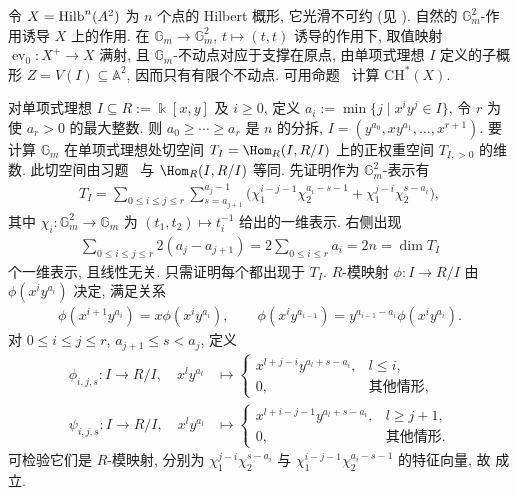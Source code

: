 \begin{example}\label{src:7.8.22}
令 $X=\operatorname{Hilb}^n(A^2)$ 为 $n$ 个点的 Hilbert 概形, 它光滑不可约 (见 ). 自然的 $\mathbb G_m^2$-作用诱导 $X$ 上的作用. 在 $\mathbb G_m\to\mathbb G_m^2$, $t\mapsto(t,t)$ 诱导的作用下, 取值映射 $\operatorname{ev}_0:X^+\to X$ 满射, 且 $\mathbb G_m$-不动点对应于支撑在原点, 由单项式理想 $I$ 定义的子概形 $Z=V(I)\subseteq\mathbb A^2$, 因而只有有限个不动点. 可用命题~ 计算 $\mathrm{CH}^*(X)$.

对单项式理想 $I\subseteq R:=\Bbbk[x,y]$ 及 $i\ge0$, 定义 $a_i:=\min\{j\mid x^iy^j\in I\}$, 令 $r$ 为使 $a_r>0$ 的最大整数. 则 $a_0\ge\cdots\ge a_r$ 是 $n$ 的分拆, $I=(y^{a_0},xy^{a_1},\ldots,x^{r+1})$. 要计算 $\mathbb G_m$ 在单项式理想处切空间 $T_I=\Hom_R(I,R/I)$ 上的正权重空间 $T_{I,>0}$ 的维数. 此切空间由习题~ 与 $\Hom_R(I,R/I)$ 等同. 先证明作为 $\mathbb G_m^2$-表示有
\begin{align}\label{src:7.8.23}
T_I=\sum_{0\le i\le j\le r}\sum_{s=a_{j+1}}^{a_j-1}\bigl(\chi_1^{i-j-1}\chi_2^{a_i-s-1}+\chi_1^{j-i}\chi_2^{s-a_i}\bigr),
\end{align}
其中 $\chi_i:\mathbb G_m^2\to\mathbb G_m$ 为 $(t_1,t_2)\mapsto t_i^{-1}$ 给出的一维表示. 右侧出现
\begin{align*}
\sum_{0\le i\le j\le r}2(a_j-a_{j+1})=2\sum_{0\le i\le r}a_i=2n=\dim T_I
\end{align*}
个一维表示, 且线性无关. 只需证明每个都出现于 $T_I$. $R$-模映射 $\phi:I\to R/I$ 由 $\phi(x^iy^{a_i})$ 决定, 满足关系
\begin{align*}
\phi(x^{i+1}y^{a_i})=x\phi(x^iy^{a_i}),\qquad\phi(x^iy^{a_{i-1}})=y^{a_{i-1}-a_i}\phi(x^iy^{a_i}).
\end{align*}
对 $0\le i\le j\le r$, $a_{j+1}\le s<a_j$, 定义
\begin{align*}
\phi_{i,j,s}:I\to R/I,\quad x^ly^{a_l}&\longmapsto\begin{cases}x^{l+j-i}y^{a_l+s-a_i},&l\le i,\\0,&\text{其他情形},\end{cases}\\
\psi_{i,j,s}:I\to R/I,\quad x^ly^{a_l}&\longmapsto\begin{cases}x^{l+i-j-1}y^{a_l+s-a_i},&l\ge j+1,\\0,&\text{其他情形}.\end{cases}
\end{align*}
可检验它们是 $R$-模映射, 分别为 $\chi_1^{j-i}\chi_2^{s-a_i}$ 与 $\chi_1^{i-j-1}\chi_2^{a_i-s-1}$ 的特征向量, 故  成立.


\end{example}
